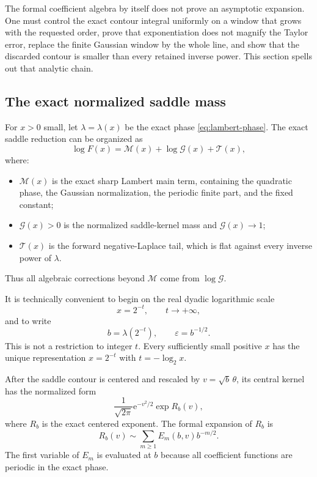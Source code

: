 \documentclass[11pt,oneside]{article}
\theoremstyle{definition}
\theoremstyle{remark}
\newcommand{\e}{\mathrm e}
\newcommand{\Main}{\mathcal M}
\begin{document}
The formal coefficient algebra by itself does not prove an asymptotic
expansion.  One must control the exact contour integral uniformly on a
window that grows with the requested order, prove that exponentiation does
not magnify the Taylor error, replace the finite Gaussian window by the
whole line, and show that the discarded contour is smaller than every
retained inverse power.  This section spells out that analytic chain.

\subsection{The exact normalized saddle mass}

For $x>0$ small, let $\lambda=\lambda(x)$ be the exact phase
\eqref{eq:lambert-phase}.  The exact saddle reduction can be organized as
\begin{equation}
 \log F(x)
 =\Main(x)+\log\mathcal G(x)+\mathcal T(x),
 \label{eq:exact-saddle-reduction}
\end{equation}
where:
\begin{itemize}
\item $\Main(x)$ is the exact sharp Lambert main term, containing the
quadratic phase, the Gaussian normalization, the periodic finite part, and
the fixed constant;
\item $\mathcal G(x)>0$ is the normalized saddle-kernel mass and
$\mathcal G(x)\to1$;
\item $\mathcal T(x)$ is the forward negative-Laplace tail, which is flat
against every inverse power of $\lambda$.
\end{itemize}
Thus all algebraic corrections beyond $\Main$ come from $\log\mathcal G$.

It is technically convenient to begin on the real dyadic logarithmic
scale
\[
 x=2^{-t},\qquad t\to+\infty,
\]
and to write
\[
 b=\lambda(2^{-t}),\qquad \varepsilon=b^{-1/2}.
\]
This is not a restriction to integer $t$.  Every sufficiently small
positive $x$ has the unique representation $x=2^{-t}$ with
$t=-\log_2x$.

After the saddle contour is centered and rescaled by
$v=\sqrt b\,\theta$, its central kernel has the normalized form
\begin{equation}
 \frac1{\sqrt{2\pi}}\e^{-v^2/2}
 \exp R_b(v), \label{eq:normalized-central-kernel}
\end{equation}
where $R_b$ is the exact centered exponent.  The formal expansion of
$R_b$ is
\begin{equation}
 R_b(v)\sim\sum_{m\geq1}E_m(b,v)b^{-m/2}.
 \label{eq:R-formal}
\end{equation}
The first variable of $E_m$ is evaluated at $b$ because all coefficient
functions are periodic in the exact phase.
\end{document}
